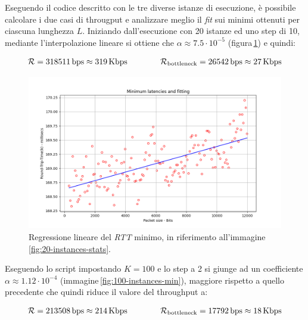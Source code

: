 Eseguendo il codice descritto con le tre diverse istanze di esecuzione, è possibile calcolare i due casi di througput e analizzare meglio il \textsl{fit} sui minimi ottenuti per ciascuna lunghezza $L$. Iniziando dall'esecuzione con 20 istanze ed uno step di 10, mediante l'interpolazione lineare si ottiene che $\alpha \approx 7.5 \cdot 10^{-5}$ (figura\,\ref{fig:20-instances-min}) e quindi:

\begin{gather*}
    \mathcal{R} = 318511\,\text{bps} \approx  319\,\text{Kbps}  \hspace{40px} \mathcal{R}_{\text{bottleneck}} = 26542\,\text{bps} \approx  27\,\text{Kbps}
\end{gather*}

\begin{figure}[h]
    \centering
    \includegraphics[width = .8\textwidth]{hw-2/report/imgs/20-instances/la-min-latencies.png}
    \caption{Regressione lineare del \textsl{RTT} minimo, in riferimento all'immagine\,\ref{fig:20-instances-stats}.}
    \label{fig:20-instances-min}
\end{figure}

\FloatBarrier\noindent Eseguendo lo script impostando $K = 100$ e lo step a 2 si giunge ad un coefficiente $\alpha \approx 1.12 \cdot 10^{-4}$ (immagine\,\ref{fig:100-instances-min}), maggiore rispetto a quello precedente che quindi riduce il valore del throughput a:

\begin{gather*}
    \mathcal{R} = 213508\,\text{bps} \approx  214\,\text{Kbps}  \hspace{40px} \mathcal{R}_{\text{bottleneck}} = 17792\,\text{bps} \approx  18\,\text{Kbps}
\end{gather*}

